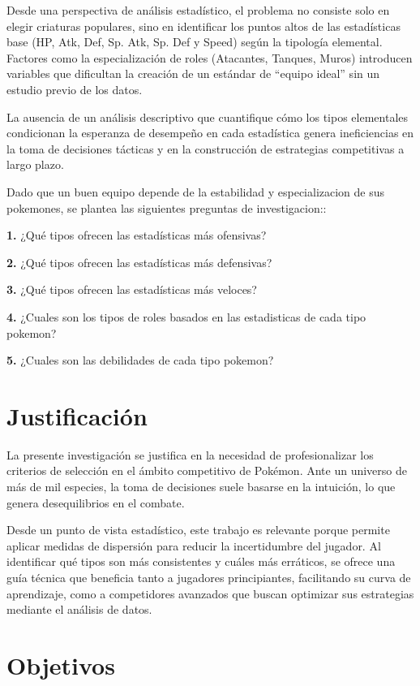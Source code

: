 \documentclass[oneside,11pt]{Latex/Classes/PhDthesisPSnPDF}
\begin{document}
Desde una perspectiva de análisis estadístico, el problema no consiste
solo en elegir criaturas populares, sino en identificar los puntos altos
de las estadísticas base (HP, Atk, Def, Sp. Atk, Sp. Def y Speed) según
la tipología elemental. Factores como la especialización de roles
(Atacantes, Tanques, Muros) introducen variables que dificultan la
creación de un estándar de ``equipo ideal'' sin un estudio previo de los
datos.

La ausencia de un análisis descriptivo que cuantifique cómo los tipos
elementales condicionan la esperanza de desempeño en cada estadística
genera ineficiencias en la toma de decisiones tácticas y en la
construcción de estrategias competitivas a largo plazo.

Dado que un buen equipo depende de la estabilidad y especializacion de
sus pokemones, se plantea las siguientes preguntas de investigacion::

\textbf{1.} ¿Qué tipos ofrecen las estadísticas más ofensivas?

\textbf{2.} ¿Qué tipos ofrecen las estadísticas más defensivas?

\textbf{3.} ¿Qué tipos ofrecen las estadísticas más veloces?

\textbf{4.} ¿Cuales son los tipos de roles basados en las estadisticas
de cada tipo pokemon?

\textbf{5.} ¿Cuales son las debilidades de cada tipo pokemon?

\section{Justificación}

La presente investigación se justifica en la necesidad de
profesionalizar los criterios de selección en el ámbito competitivo de
Pokémon. Ante un universo de más de mil especies, la toma de decisiones
suele basarse en la intuición, lo que genera desequilibrios en el
combate.

Desde un punto de vista estadístico, este trabajo es relevante porque
permite aplicar medidas de dispersión para reducir la incertidumbre del
jugador. Al identificar qué tipos son más consistentes y cuáles más
erráticos, se ofrece una guía técnica que beneficia tanto a jugadores
principiantes, facilitando su curva de aprendizaje, como a competidores
avanzados que buscan optimizar sus estrategias mediante el análisis de
datos.\\

\section{Objetivos}
\end{document}

